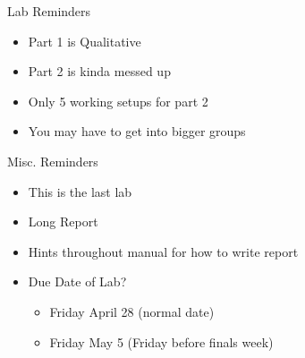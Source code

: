 \documentclass{beamer}
\begin{document}
\begin{frame}{Lab Reminders}
  \begin{itemize}
  \item Part 1 is Qualitative
  \item Part 2 is kinda messed up
  \item Only 5 working setups for part 2
  \item You may have to get into bigger groups
  \end{itemize}
\end{frame}

\begin{frame}{Misc. Reminders}
  \begin{itemize}
  \item This is the last lab
  \item Long Report
  \item Hints throughout manual for how to write report
  \item Due Date of Lab?
    \begin{itemize}
    \item Friday April 28 (normal date)
    \item Friday May 5 (Friday before finals week)
    \end{itemize}
  \end{itemize}
\end{frame}
\end{document}
